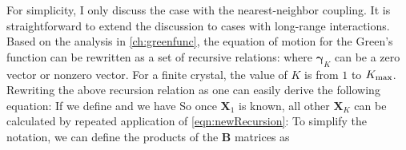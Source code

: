 For simplicity, I only discuss the case with the nearest-neighbor coupling. It is straightforward to extend the discussion to
cases with long-range interactions. Based on the analysis in \autoref{ch:greenfunc}, the equation of motion for the Green's
function can be rewritten as a set of recursive relations:
where $\boldsymbol\gamma_{K}$ can be a zero vector or nonzero vector. For a finite crystal, the value of $K$ is from 
$1$ to  $K_{\rm max}$. Rewriting the above recursion relation as
one can easily derive the following equation:
If we define
and 
we have 
So once $\mathbf{X}_1$ is known, all other $\mathbf{X}_K$ can be calculated by repeated application of 
\autoref{eqn:newRecursion}:
To simplify the notation, we can define the products of the $\mathbf{B}$ matrices as
